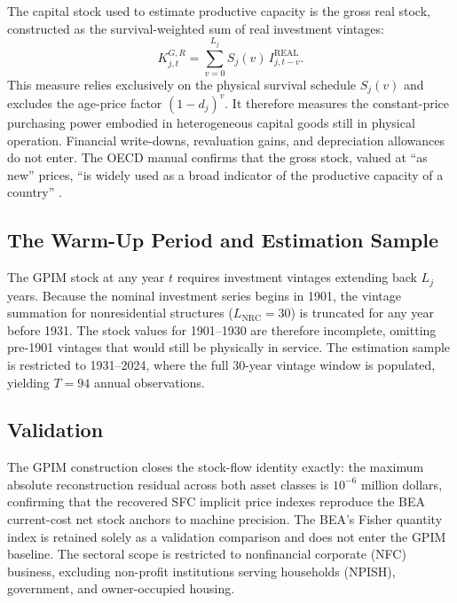 The capital stock used to estimate productive capacity is the gross
real stock, constructed as the survival-weighted sum of real
investment vintages:
\begin{equation}
	K^{G,R}_{j,t} = \sum_{v=0}^{L_j} S_j(v)\,
	I^{\text{REAL}}_{j,t-v}.
	\label{eq:A1:gross_stock}
\end{equation}
This measure relies exclusively on the physical survival schedule
$S_j(v)$ and excludes the age-price factor $(1-d_j)^v$. It
therefore measures the constant-price purchasing power embodied in
heterogeneous capital goods still in physical operation. Financial
write-downs, revaluation gains, and depreciation allowances do not
enter. The OECD manual confirms that the gross stock, valued at
``as new'' prices, ``is widely used as a broad indicator of the
productive capacity of a country'' \citep[31]{OECD2001}.

\subsection{The Warm-Up Period and Estimation Sample}
\label{app:A1:warmup}

The GPIM stock at any year $t$ requires investment vintages
extending back $L_j$ years. Because the nominal investment series
begins in 1901, the vintage summation for nonresidential structures
($L_{\text{NRC}} = 30$) is truncated for any year before 1931.
The stock values for 1901--1930 are therefore incomplete, omitting
pre-1901 vintages that would still be physically in service. The
estimation sample is restricted to 1931--2024, where the full
30-year vintage window is populated, yielding $T = 94$ annual
observations.

\subsection{Validation}
\label{app:A1:validation}

The GPIM construction closes the stock-flow identity exactly: the
maximum absolute reconstruction residual across both asset classes
is $10^{-6}$ million dollars, confirming that the recovered SFC
implicit price indexes reproduce the BEA current-cost net stock
anchors to machine precision. The BEA's Fisher quantity index is
retained solely as a validation comparison and does not enter the
GPIM baseline. The sectoral scope is restricted to nonfinancial
corporate (NFC) business, excluding non-profit institutions serving
households (NPISH), government, and owner-occupied housing.

